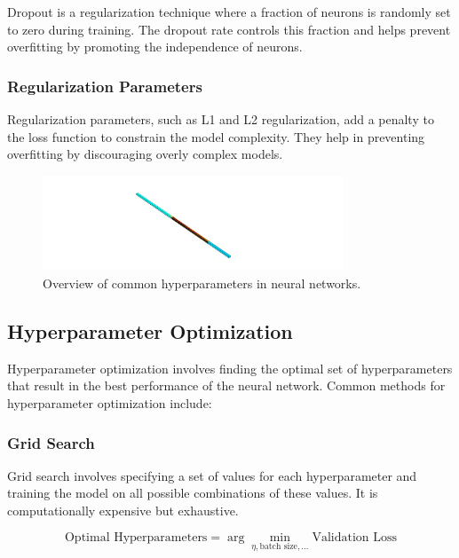 \documentclass{report}
\begin{document}
        Dropout is a regularization technique where a fraction of neurons is randomly set to zero during training. The dropout rate controls this fraction and helps prevent overfitting by promoting the independence of neurons.
        
        \subsubsection{Regularization Parameters}
        
        Regularization parameters, such as L1 and L2 regularization, add a penalty to the loss function to constrain the model complexity. They help in preventing overfitting by discouraging overly complex models.
        
        \begin{figure}[h]
            \centering
            \includegraphics[width=0.8\textwidth]{00_Images/00_Velocity.png}
            \caption{Overview of common hyperparameters in neural networks.}
            \label{fig:hyperparameters}
        \end{figure}
        
        \subsection{Hyperparameter Optimization}
        
        Hyperparameter optimization involves finding the optimal set of hyperparameters that result in the best performance of the neural network. Common methods for hyperparameter optimization include:
        
        \subsubsection{Grid Search}
        
        Grid search involves specifying a set of values for each hyperparameter and training the model on all possible combinations of these values. It is computationally expensive but exhaustive.
        
        \begin{equation}
        \text{Optimal Hyperparameters} = \arg \min_{\eta, \text{batch size}, \ldots} \text{Validation Loss}
        \end{equation}
        
\end{document}
